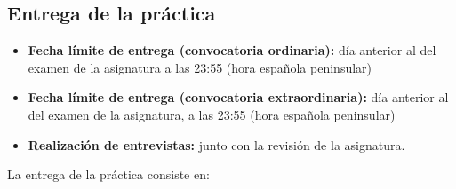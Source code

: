 \subsection{Entrega de la práctica}

\begin{itemize}
  \item \textbf{Fecha límite de entrega (convocatoria ordinaria):} día anterior al del examen de la asignatura a las 23:55 (hora española peninsular)
  \item \textbf{Fecha límite de entrega (convocatoria extraordinaria):} día anterior al del examen de la asignatura, a las 23:55 (hora española peninsular)
  \item \textbf{Realización de entrevistas:} junto con la revisión de la asignatura.    

\end{itemize}

La entrega de la práctica consiste en:

